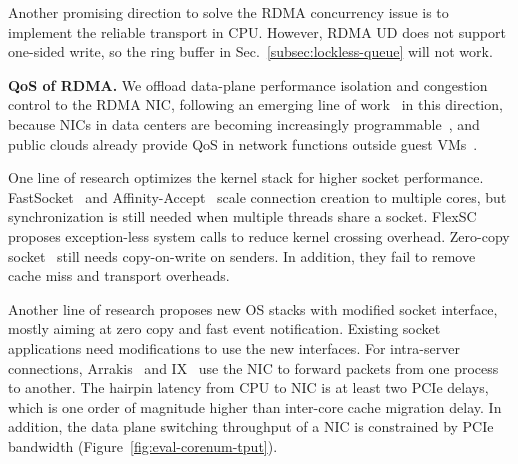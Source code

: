 Another promising direction to solve the RDMA concurrency issue is to implement the reliable transport in CPU. However, RDMA UD does not support one-sided write, so the ring buffer in Sec.~\ref{subsec:lockless-queue} will not work.

\textbf{QoS of RDMA.}
We offload data-plane performance isolation and congestion control to the RDMA NIC, following an emerging line of work~\cite{peter2016arrakis,zhu2015congestion,lu2017memory,mprdma,mittal2018revisiting} in this direction, because NICs in data centers are becoming increasingly programmable~\cite{cavium,kaufmann2015flexnic,mellanox-innova,mellanox-bluefield}, and public clouds already provide QoS in network functions outside guest VMs~\cite{smartnic,li2016clicknp}.




\iffalse
{}
One line of research optimizes the kernel stack for higher socket performance. FastSocket~\cite{lin2016scalable} and Affinity-Accept~\cite{pesterev2012improving} scale connection creation to multiple cores, but synchronization is still needed when multiple threads share a socket.
FlexSC~\cite{soares2010flexsc} proposes exception-less system calls to reduce kernel crossing overhead.
Zero-copy socket~\cite{thadani1995efficient,chu1996zero} still needs copy-on-write on senders.
In addition, they fail to remove cache miss and transport overheads.


Another line of research proposes new OS stacks with modified socket interface, mostly aiming at zero copy and fast event notification. Existing socket applications need modifications to use the new interfaces.
For intra-server connections, Arrakis~\cite{peter2016arrakis} and IX~\cite{belay2017ix} use the NIC to forward packets from one process to another. The hairpin latency from CPU to NIC is at least two PCIe delays, which is one order of magnitude higher than inter-core cache migration delay. In addition, the data plane switching throughput of a NIC is constrained by PCIe bandwidth (Figure~\ref{fig:eval-corenum-tput}).


